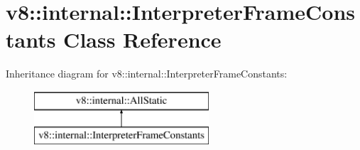 \hypertarget{classv8_1_1internal_1_1_interpreter_frame_constants}{}\section{v8\+:\+:internal\+:\+:Interpreter\+Frame\+Constants Class Reference}
\label{classv8_1_1internal_1_1_interpreter_frame_constants}
Inheritance diagram for v8\+:\+:internal\+:\+:Interpreter\+Frame\+Constants\+:\begin{figure}[H]
\begin{center}
\leavevmode
\includegraphics[height=2.000000cm]{classv8_1_1internal_1_1_interpreter_frame_constants}
\end{center}
\end{figure}
